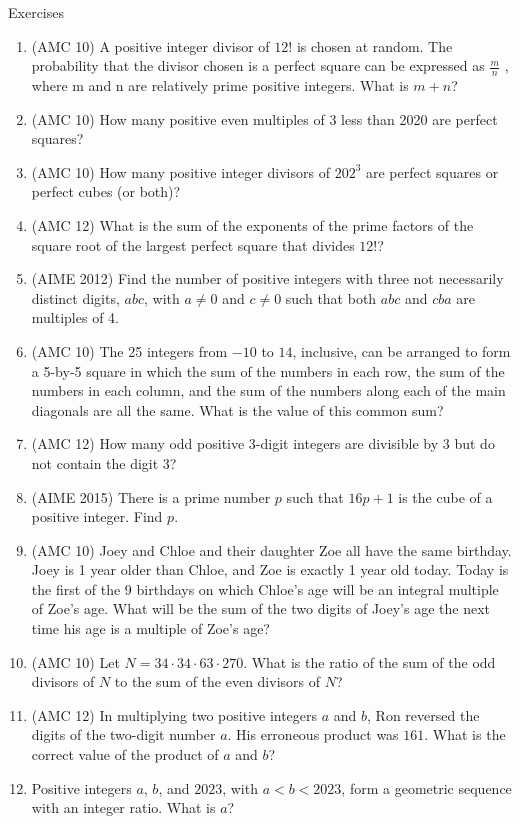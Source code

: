 \begin{xcb}{Exercises}
\begin{enumerate}
\item (AMC 10) A positive integer divisor of $12!$ is chosen at random. The probability that the divisor chosen is a perfect square can be expressed as $\frac{m}{n}$ , where m and n are relatively prime positive integers. What is $m + n$?
\item (AMC 10) How many positive even multiples of 3 less than 2020 are perfect squares?
\item (AMC 10) How many positive integer divisors of $202^3$ are perfect squares or perfect cubes (or both)?
\item(AMC 12) What is the sum of the exponents of the prime factors of the square root of the largest perfect square that divides $12!$?
\item (AIME 2012) Find the number of positive integers with three not necessarily distinct digits, $abc$, with $a \neq 0$ and $c \neq 0$ such that both $abc$ and $cba$ are multiples of 4.
\item (AMC 10) The 25 integers from $-10$ to $14$, inclusive, can be arranged to form a 5-by-5 square in which the sum of the numbers in each row, the sum of the numbers in each column, and the sum of the numbers along each of the main diagonals are all the same. What is the value of this common sum?
\item(AMC 12) How many odd positive 3-digit integers are divisible by 3 but do not contain the digit 3?
\item (AIME 2015) There is a prime number $p$ such that $16p + 1$ is the cube of a positive integer. Find $p$.
\item (AMC 10) Joey and Chloe and their daughter Zoe all have the same birthday. Joey is 1 year older than Chloe, and Zoe is exactly 1 year old today. Today is the first of the 9 birthdays on which Chloe’s age will be an integral multiple of Zoe’s age. What will be the sum of the two digits of Joey’s age the next time his age is a multiple of Zoe’s age?
\item (AMC 10) Let $N = 34 \cdot 34 \cdot 63 \cdot 270$. What is the ratio of the sum of the odd divisors of $N$ to the sum of the even divisors of $N$?
\item (AMC 12) In multiplying two positive integers $a$ and $b$, Ron reversed the digits of the two-digit number $a$. His erroneous product was $161$. What is the correct value of the product of $a$ and $b$?
\item Positive integers $a$, $b$, and $2023$, with $a<b<2023$, form a geometric sequence with an integer ratio. What is $a$?

\end{enumerate}
\end{xcb}
